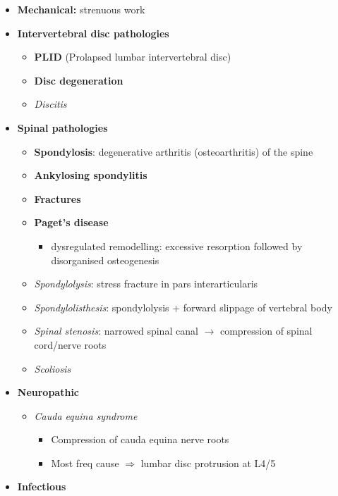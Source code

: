 \documentclass[
  12pt,
]{memoir}
\providecommand{\tightlist}{%
  \setlength{\itemsep}{0pt}\setlength{\parskip}{0pt}}
\begin{document}
\begin{itemize}
\tightlist
\item
  \textbf{Mechanical:} strenuous work
\item
  \textbf{Intervertebral disc pathologies}

  \begin{itemize}
  \tightlist
  \item
    \textbf{PLID} (Prolapsed lumbar intervertebral disc)
  \item
    \textbf{Disc degeneration}
  \item
    \emph{Discitis}
  \end{itemize}
\item
  \textbf{Spinal pathologies}

  \begin{itemize}
  \tightlist
  \item
    \textbf{Spondylosis}: degenerative arthritis (osteoarthritis) of the
    spine
  \item
    \textbf{Ankylosing spondylitis}
  \item
    \textbf{Fractures}
  \item
    \textbf{Paget's disease}

    \begin{itemize}
    \tightlist
    \item
      dysregulated remodelling: excessive resorption followed by
      disorganised osteogenesis
    \end{itemize}
  \item
    \emph{Spondylolysis}: stress fracture in pars interarticularis
  \item
    \emph{Spondylolisthesis}: spondylolysis + forward slippage of
    vertebral body
  \item
    \emph{Spinal stenosis}: narrowed spinal canal \(\rightarrow\)
    compression of spinal cord/nerve roots
  \item
    \emph{Scoliosis}
  \end{itemize}
\item
  \textbf{Neuropathic}

  \begin{itemize}
  \tightlist
  \item
    \emph{Cauda equina syndrome}

    \begin{itemize}
    \tightlist
    \item
      Compression of cauda equina nerve roots
    \item
      Most freq cause \(\Rightarrow\) lumbar disc protrusion at L4/5
    \end{itemize}
  \end{itemize}
\item
  \textbf{Infectious}


\end{itemize}
\end{document}
